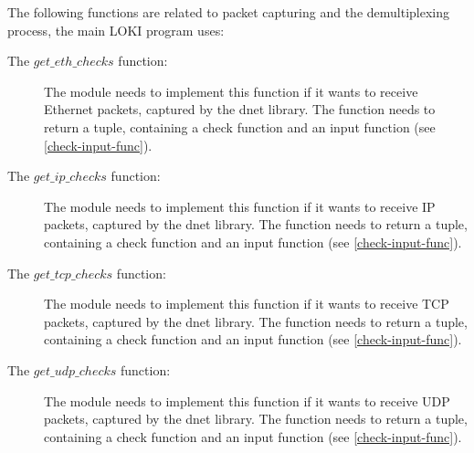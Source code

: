 \documentclass[a4paper, 11pt]{article}
\begin{document}
                The following functions are related to packet capturing and the demultiplexing process, the main LOKI program uses:
                
                \begin{description}
                    \item[The $get\_eth\_checks$ function:] The module needs to implement this function if it wants to receive Ethernet packets, captured by the dnet library. The function needs to return a tuple, containing a check function and an input function (see \ref{check-input-func}).
                    \item[The $get\_ip\_checks$ function:] The module needs to implement this function if it wants to receive IP packets, captured by the dnet library. The function needs to return a tuple, containing a check function and an input function (see \ref{check-input-func}).
                    \item[The $get\_tcp\_checks$ function:] The module needs to implement this function if it wants to receive TCP packets, captured by the dnet library. The function needs to return a tuple, containing a check function and an input function (see \ref{check-input-func}).
                    \item[The $get\_udp\_checks$ function:] The module needs to implement this function if it wants to receive UDP packets, captured by the dnet library. The function needs to return a tuple, containing a check function and an input function (see \ref{check-input-func}).
                \end{description}
\end{document}
